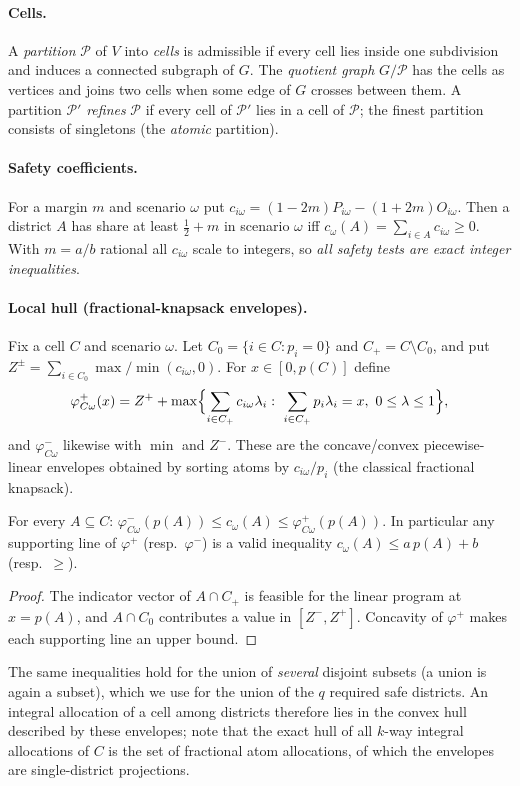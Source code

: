 \paragraph{Cells.}
A \emph{partition} $\mathcal P$ of $V$ into \emph{cells} is admissible if every cell lies inside one subdivision and induces a connected subgraph of $G$. The \emph{quotient graph} $G/\mathcal P$ has the cells as vertices and joins two cells when some edge of $G$ crosses between them. A partition $\mathcal P'$ \emph{refines} $\mathcal P$ if every cell of $\mathcal P'$ lies in a cell of $\mathcal P$; the finest partition consists of singletons (the \emph{atomic} partition).

\paragraph{Safety coefficients.}
For a margin $m$ and scenario $\omega$ put $c_{i\omega}=(1-2m)P_{i\omega}-(1+2m)O_{i\omega}$. Then a district $A$ has share at least $\tfrac12+m$ in scenario $\omega$ iff $c_\omega(A)=\sum_{i\in A}c_{i\omega}\ge0$. With $m=a/b$ rational all $c_{i\omega}$ scale to integers, so \emph{all safety tests are exact integer inequalities}.

\paragraph{Local hull (fractional-knapsack envelopes).}
Fix a cell $C$ and scenario $\omega$. Let $C_0=\{i\in C:p_i=0\}$ and $C_+=C\setminus C_0$, and put $Z^\pm=\sum_{i\in C_0}\max/\min(c_{i\omega},0)$. For $x\in[0,p(C)]$ define
\[
\varphi^{+}_{C\omega}(x)=Z^{+}+\max\Bigl\{\sum_{i\in C_+}c_{i\omega}\lambda_i:\ \sum_{i\in C_+}p_i\lambda_i=x,\ 0\le\lambda\le1\Bigr\},
\]
and $\varphi^{-}_{C\omega}$ likewise with $\min$ and $Z^-$. These are the concave/convex piecewise-linear envelopes obtained by sorting atoms by $c_{i\omega}/p_i$ (the classical fractional knapsack).

\begin{lemma}\label{lem:env}
For every $A\subseteq C$: $\varphi^-_{C\omega}(p(A))\le c_\omega(A)\le\varphi^+_{C\omega}(p(A))$. In particular any supporting line of $\varphi^+$ (resp.\ $\varphi^-$) is a valid inequality $c_\omega(A)\le a\,p(A)+b$ (resp.\ $\ge$).
\end{lemma}
\begin{proof}
The indicator vector of $A\cap C_+$ is feasible for the linear program at $x=p(A)$, and $A\cap C_0$ contributes a value in $[Z^-,Z^+]$. Concavity of $\varphi^+$ makes each supporting line an upper bound.
\end{proof}
The same inequalities hold for the union of \emph{several} disjoint subsets (a union is again a subset), which we use for the union of the $q$ required safe districts. An integral allocation of a cell among districts therefore lies in the convex hull described by these envelopes; note that the exact hull of all $k$-way integral allocations of $C$ is the set of fractional atom allocations, of which the envelopes are single-district projections.

